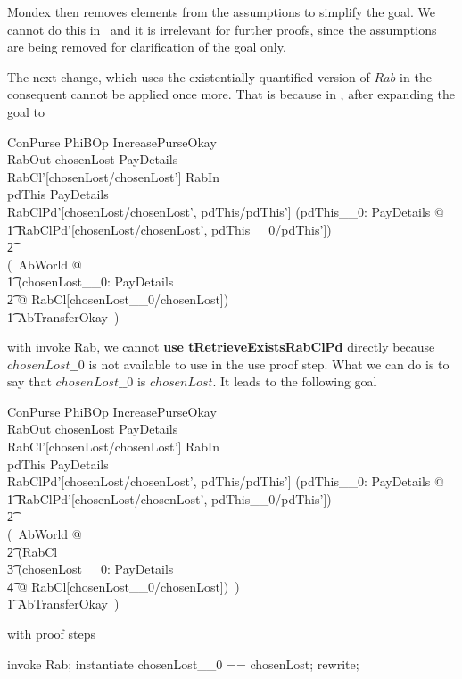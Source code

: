 Mondex then removes elements from the assumptions to simplify the goal.
We cannot do this in \zeves\ and it is irrelevant for further proofs, since
the assumptions are being removed for clarification of the goal only.

The next change, which uses the existentially quantified version of $Rab$ in
the consequent cannot be applied once more. That is because in \zeves, after
expanding the goal to
%
\begin{gzed}
    \Delta ConPurse \land PhiBOp \land IncreasePurseOkay \\
    \land RabOut \land chosenLost \in \power PayDetails \\
    \land RabCl'[chosenLost/chosenLost'] \land RabIn \\
    \land pdThis \in PayDetails \land \pdThisPred \\
    \land RabClPd'[chosenLost/chosenLost', pdThis/pdThis']
    \land (\forall pdThis\_\_0: PayDetails @ \\
        \t1 RabClPd'[chosenLost/chosenLost', pdThis\_\_0/pdThis']) \\
\t2 \implies \\
    (~\exists AbWorld @ \\
        \t1 (\exists chosenLost\_\_0: \power PayDetails \\
            \t2 @ RabCl[chosenLost\_\_0/chosenLost]) \\
        \t1 \land AbTransferOkay~)
\end{gzed}
%
with \textsf{invoke Rab}, we cannot \textbf{use tRetrieveExistsRabClPd}
directly because $chosenLost\_\_0$ is not available to use in the \textsf{use} proof step.
What we can do is to say that $chosenLost\_\_0$ is $chosenLost$. It leads to the following
goal
%
\begin{gzed}
    \Delta ConPurse \land PhiBOp \land IncreasePurseOkay \\
    \land RabOut \land chosenLost \in \power PayDetails \\
    \land RabCl'[chosenLost/chosenLost'] \land RabIn \\
    \land pdThis \in PayDetails \land \pdThisPred \\
    \land RabClPd'[chosenLost/chosenLost', pdThis/pdThis']
    \land (\forall pdThis\_\_0: PayDetails @ \\
        \t1 RabClPd'[chosenLost/chosenLost', pdThis\_\_0/pdThis']) \\
\t2 \implies \\
    (~\exists AbWorld @ \\
            \t2 (RabCl \lor \\
                \t3 (\exists chosenLost\_\_0: \power PayDetails \\
                    \t4 @ RabCl[chosenLost\_\_0/chosenLost])~) \\
        \t1 \land AbTransferOkay~)
\end{gzed}
%
with proof steps
%
\begin{gzproof}
    invoke Rab;
    instantiate chosenLost\_\_0 == chosenLost;
    rewrite;
\end{gzproof}

